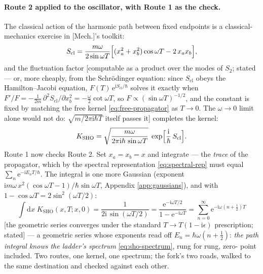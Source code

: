 \documentclass[11pt]{article}
\theoremstyle{plain}
\theoremstyle{definition}
\theoremstyle{remark}
\newcommand{\dd}{\mathrm{d}}
\newcommand{\ee}{\mathrm{e}}
\newcommand{\ii}{\mathrm{i}}
\begin{document}
\paragraph{Route 2 applied to the oscillator, with Route 1 as the check.} The
classical action of the harmonic path between fixed endpoints is a
classical-mechanics exercise in [Mech.]'s toolkit:
\begin{equation}
  S_{\text{cl}}
  = \frac{m\omega}{2\sin\omega T}
    \Bigl[
      (x_a^2 + x_b^2)\cos\omega T - 2\,x_a x_b
    \Bigr],
\end{equation}
and the fluctuation factor [computable as a product over the modes
of $S_2$; stated --- or, more cheaply, from the Schr\"odinger
equation: since $S_{\text{cl}}$ obeys the Hamilton--Jacobi equation,
$F(T)\,\ee^{\ii S_{\text{cl}}/\hbar}$ solves it exactly when
$F'/F = -\tfrac{1}{2m}\,\partial^2 S_{\text{cl}}/\partial x_b^2
= -\tfrac\omega2\cot\omega T$, so $F \propto (\sin\omega T)^{-1/2}$,
and the constant is fixed by matching the free kernel
\eqref{eq:free-propagator} as $T \to 0$. The $\omega \to 0$ limit
alone would not do: $\sqrt{m/2\pi\ii\hbar T}$ itself passes it]
completes the kernel:
\begin{equation}
  K_{\text{SHO}}
  = \sqrt{\frac{m\omega}{2\pi\ii\hbar\,\sin\omega T}}\;
    \exp\Bigl[\frac{\ii}{\hbar}\,S_{\text{cl}}\Bigr].
  \label{eq:mehler}
\end{equation}
Route 1 now checks Route 2. Set $x_a = x_b = x$ and integrate ---
the \emph{trace} of the propagator, which by the spectral
representation \eqref{eq:spectral-rep} must equal
$\sum_n \ee^{-\ii E_n T/\hbar}$. The integral is one more Gaussian
(exponent
$\ii m\omega\,x^2(\cos\omega T - 1)/\hbar\sin\omega T$, Appendix
\ref{app:gaussians}), and with $1 - \cos\omega T =
2\sin^2(\omega T/2)$:
\begin{equation}
  \int\dd x\; K_{\text{SHO}}(x, T; x, 0)
  = \frac{1}{2\ii\,\sin(\omega T/2)}
  = \frac{\ee^{-\ii\omega T/2}}{1 - \ee^{-\ii\omega T}}
  = \sum_{n=0}^{\infty}
    \ee^{-\ii\omega\left(n + \frac12\right) T}
  \label{eq:trace-check}
\end{equation}
[the geometric series converges under the standard
$T \to T(1 - \ii\epsilon)$ prescription; stated]
--- a geometric series whose exponents read off
$E_n = \hbar\omega(n + \tfrac12)$: \emph{the path integral knows the
ladder's spectrum} \eqref{eq:sho-spectrum}, rung for rung, zero-%
point included. Two routes, one kernel, one spectrum; the fork's two
roads, walked to the same destination and checked against each
other.
\end{document}
